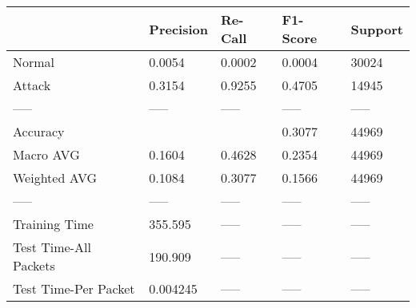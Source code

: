 \begin{tabular}{lllll}
\toprule
{} & Precision & Re-Call & F1-Score & Support \\
\midrule
Normal                &    0.0054 &  0.0002 &   0.0004 &   30024 \\
Attack                &    0.3154 &  0.9255 &   0.4705 &   14945 \\
-----                 &     ----- &   ----- &    ----- &   ----- \\
Accuracy              &           &         &   0.3077 &   44969 \\
Macro AVG             &    0.1604 &  0.4628 &   0.2354 &   44969 \\
Weighted AVG          &    0.1084 &  0.3077 &   0.1566 &   44969 \\
-----                 &     ----- &   ----- &    ----- &   ----- \\
Training Time         &   355.595 &   ----- &    ----- &   ----- \\
Test Time-All Packets &   190.909 &   ----- &    ----- &   ----- \\
Test Time-Per Packet  &  0.004245 &   ----- &    ----- &   ----- \\
\bottomrule
\end{tabular}

